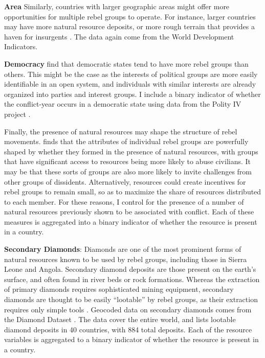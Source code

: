 \textbf{Area} Similarly, countries with larger geographic areas might offer more opportunities for multiple rebel groups to operate. For instance, larger countries may have more natural resource deposits, or more rough terrain that provides a haven for insurgents \citep[see][]{fearonlaitin03}. The data again come from the World Development Indicators.

\textbf{Democracy} \citet{Wolford} find that democratic states tend to have more rebel groups than others. This might be the case as the interests of political groups are more easily identifiable in an open system, and individuals with similar interests are already organized into parties and interest groups. I include a binary indicator of whether the conflict-year occurs in a democratic state using data from the Polity IV project \citep{Marshall2012}.

Finally, the presence of natural resources may shape the structure of rebel movements. \citet{Weinstein2007} finds that the attributes of individual rebel groups are powerfully shaped by whether they formed in the presence of natural resources, with groups that have significant access to resources being more likely to abuse civilians. It may be that these sorts of groups are also more likely to invite challenges from other groups of dissidents. Alternatively, resources could create incentives for rebel groups to remain small, so as to maximize the share of resources distributed to each member. For these reasons, I control for the presence of a number of natural resources previously shown to be associated with conflict. Each of these measures is aggregated into a binary indicator of whether the resource is present in a country.

\textbf{Secondary Diamonds}: Diamonds are one of the most prominent forms of natural resources known to be used by rebel groups, including those in Sierra Leone and Angola. Secondary diamond deposits are those present on the earth's surface, and often found in river beds or rock formations. Whereas the extraction of primary diamonds requires sophisticated mining equipment, secondary diamonds are thought to be easily ``lootable'' by rebel groups, as their extraction requires only simple tools \citep{Lujala2005}. Geocoded data on secondary diamonds comes from the Diamond Dataset \citep{Gilmore2007,Lujala2005}. The data cover the entire world, and lists lootable diamond deposits in 40 countries, with 884 total deposits. Each of the resource variables is aggregated to a binary indicator of whether the resource is present in a country.

